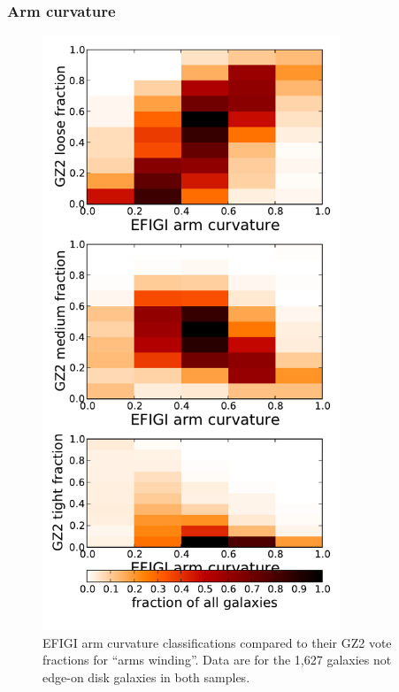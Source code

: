 \documentclass[useAMS,usenatbib]{mn2e}
\begin{document}
%

\subsubsection{Arm curvature}

\begin{figure}
\includegraphics[angle=0,width=3.5in]{figures/efigi_arm_curvature.pdf}
\caption{EFIGI arm curvature classifications compared to their GZ2 vote fractions for ``arms winding''. Data are for the 1,627 galaxies not edge-on disk galaxies in both samples.  
\label{fig-efigi_arms}}
\end{figure}
\end{document}
